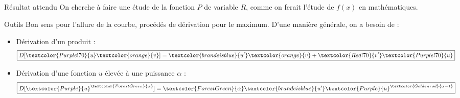 \documentclass[../main/main.tex]{subfiles}
\begin{document}
\subsection{}
\begin{tcbraster}[raster columns=3, raster equal height=rows]
    \begin{NCprop}{Résultat attendu}
        On cherche à faire une étude de la fonction $P$ de variable $R$, comme
        on ferait l'étude de $f(x)$ en mathématiques.
    \end{NCprop}
    \begin{NCdemo}[raster multicolumn=2]{Outils}
        Bon sens pour l'allure de la courbe, procédés de dérivation pour le
        maximum. D'une manière générale, on a besoin de :
        \begin{itemize}
            \item Dérivation d'un produit :
                \begin{equation*}
                    \boxed{D[\textcolor{Purple!70}{u}
                        \textcolor{orange}{v}] =
                    \textcolor{brandeisblue}{u'}\textcolor{orange}{v} +
                \textcolor{Red!70}{v'}\textcolor{Purple!70}{u}}
                \end{equation*}
            \item Dérivation d'une fonction $u$ élevée à une puissance $\alpha$
                :
                \begin{equation*}
                    \boxed{D[\textcolor{Purple}{u}^
                        {\textcolor{ForestGreen}{\alpha}}] =
                    \textcolor{ForestGreen}{\alpha} \textcolor{brandeisblue}{u'}
                \textcolor{Purple}{u}^{\textcolor{Goldenrod}{\alpha-1}}}
                \end{equation*}
        \end{itemize}
    \end{NCdemo}
\end{tcbraster}
\vfill
\end{document}

